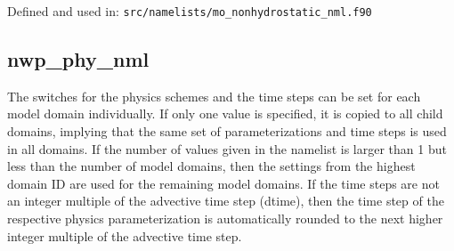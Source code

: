 Defined and used in: \verb+src/namelists/mo_nonhydrostatic_nml.f90+


\subsection{nwp\_phy\_nml}

The switches for the physics schemes and the time steps can be set for each model domain individually.
If only one value is specified, it is copied to all child domains, implying that the same set
of parameterizations and time steps is used in all domains. If the number of values given
in the namelist is larger than 1 but less than the number of model domains, then the settings
from the highest domain ID are used for the remaining model domains. If the time steps are not
an integer multiple of the advective time step (dtime), then the time step of the
respective physics parameterization is automatically rounded to the next higher integer multiple
of the advective time step.

